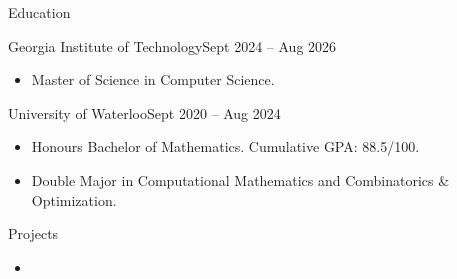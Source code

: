 \documentclass[]{mcdowellcv}
\begin{document}
	\makeheader
	\begin{cvsection}{Education}
		\begin{cvsubsection}{Georgia Institute of Technology}{}{Sept 2024 -- Aug 2026}
			\begin{itemize}
				\item Master of Science in Computer Science.
			\end{itemize}
		\end{cvsubsection}
		\begin{cvsubsection}{University of Waterloo}{}{Sept 2020 -- Aug 2024}
			\begin{itemize}
				\item Honours Bachelor of Mathematics. Cumulative GPA: 88.5/100.
				\item Double Major in Computational Mathematics and Combinatorics \& Optimization.
			\end{itemize}
		\end{cvsubsection}
	\end{cvsection}
	
	
	\begin{cvsection}{Projects}
		\begin{cvsubsection}{}{}{}
			\begin{itemize}
				\item 
			\end{itemize}
		\end{cvsubsection}
	\end{cvsection}

	
	

	
	
	
\end{document}
